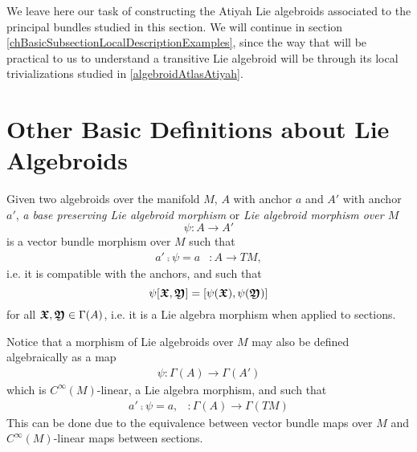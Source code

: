 We leave here our task of constructing the Atiyah Lie algebroids associated to the principal bundles studied in this section. We will continue in section \ref{chBasicSubsectionLocalDescriptionExamples}, since the way that will be practical to us to understand a transitive Lie algebroid will be through its local trivializations studied in \ref{algebroidAtlasAtiyah}.

\section{Other Basic Definitions about Lie Algebroids}
\begin{definition}  \label{defnMorph}
Given two algebroids over the manifold $M$, $A$ with anchor $a$ and $A'$ with anchor $a'$, \emph{a base preserving Lie algebroid morphism} or \emph{Lie algebroid morphism over $M$} 
\[\psi: A \to A'\]
is a vector bundle morphism over $M$ such that 
\begin{align}
    a' \comp \psi = a & : A \to TM,
\end{align}
i.e. it is compatible with the anchors, and such that 
\[\psi[\bm{\mathfrak{X}}, \bm{\mathfrak{Y}}] = [\psi(\bm{\mathfrak{X}}), \psi(\bm{\mathfrak{Y}})]\] 
for all $\bm{\mathfrak{X}}, \bm{\mathfrak{Y}} \in \Gamma(A)$, i.e. it is a Lie algebra morphism when applied to sections. 
\end{definition}

\begin{remark}
Notice that a morphism of Lie algebroids over $M$ may also be defined algebraically as a map
\begin{align*}
    \psi: \Gamma(A) \to \Gamma(A')
\end{align*}
which is $C^\infty(M)$-linear, a Lie algebra morphism, and such that
\begin{align*}
    a' \comp \psi = a, & :\Gamma(A) \to \Gamma(TM)
\end{align*}
This can be done due to the equivalence between vector bundle maps over $M$ and $C^\infty(M)$-linear maps between sections.
\end{remark}

